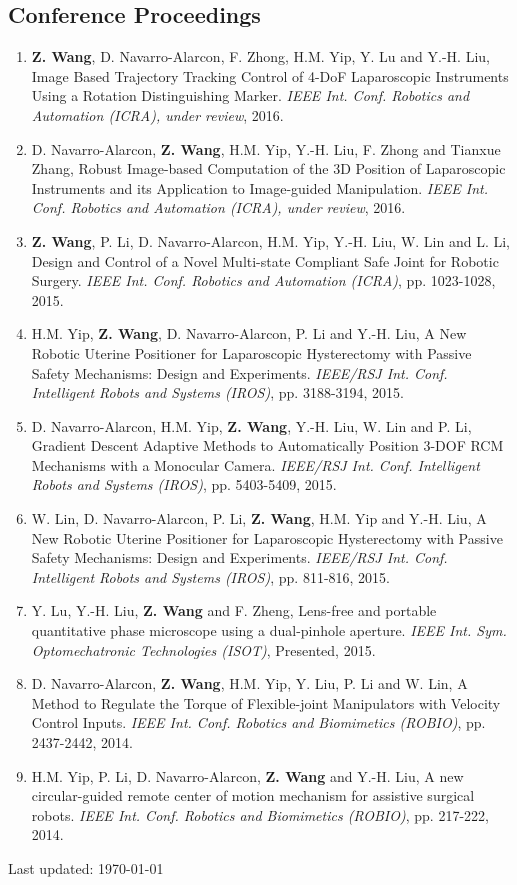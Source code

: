 \documentclass[10pt,letterpaper]{article}
\begin{document}
\subsection*{Conference Proceedings}
\begin{enumerate}
\item \textbf{Z. Wang}, D. Navarro-Alarcon, F. Zhong, H.M. Yip, Y. Lu and Y.-H. Liu,
  Image Based Trajectory Tracking Control of 4-DoF Laparoscopic Instruments Using a Rotation Distinguishing Marker.
  \textit{{IEEE} Int. Conf. Robotics and Automation (ICRA), under review}, 2016.
\item D. Navarro-Alarcon, \textbf{Z. Wang}, H.M. Yip, Y.-H. Liu, F. Zhong and Tianxue Zhang,
  Robust Image-based Computation of the 3D Position of Laparoscopic Instruments and its Application to Image-guided Manipulation.
  \textit{{IEEE} Int. Conf. Robotics and Automation (ICRA), under review}, 2016.
\item \textbf{Z. Wang}, P. Li, D. Navarro-Alarcon, H.M. Yip, Y.-H. Liu, W. Lin and L. Li,
  Design and Control of a Novel Multi-state Compliant Safe Joint for Robotic Surgery.
  \textit{{IEEE} Int. Conf. Robotics and Automation (ICRA)}, pp. 1023-1028, 2015.
\item H.M. Yip, \textbf{Z. Wang}, D. Navarro-Alarcon, P. Li and Y.-H. Liu,
  A New Robotic Uterine Positioner for Laparoscopic Hysterectomy with Passive Safety Mechanisms: Design and Experiments.
  \textit{{IEEE/RSJ} Int. Conf. Intelligent Robots and Systems (IROS)}, pp. 3188-3194, 2015.
\item D. Navarro-Alarcon, H.M. Yip, \textbf{Z. Wang}, Y.-H. Liu, W. Lin and P. Li,
  Gradient Descent Adaptive Methods to Automatically Position 3-DOF RCM Mechanisms with a Monocular Camera.
  \textit{{IEEE/RSJ} Int. Conf. Intelligent Robots and Systems (IROS)}, pp. 5403-5409, 2015.
\item W. Lin, D. Navarro-Alarcon, P. Li, \textbf{Z. Wang}, H.M. Yip and Y.-H. Liu,
  A New Robotic Uterine Positioner for Laparoscopic Hysterectomy with Passive Safety Mechanisms: Design and Experiments.
  \textit{{IEEE/RSJ} Int. Conf. Intelligent Robots and Systems (IROS)}, pp. 811-816, 2015.
\item Y. Lu, Y.-H. Liu, \textbf{Z. Wang} and F. Zheng,
  Lens-free and portable quantitative phase microscope using a dual-pinhole aperture.
  \textit{{IEEE} Int. Sym. Optomechatronic Technologies (ISOT)}, Presented, 2015.
\item D. Navarro-Alarcon, \textbf{Z. Wang}, H.M. Yip, Y. Liu, P. Li and W. Lin,
  A Method to Regulate the Torque of Flexible-joint Manipulators with Velocity Control Inputs.
  \textit{{IEEE} Int. Conf. Robotics and Biomimetics (ROBIO)}, pp. 2437-2442, 2014.
\item H.M. Yip, P. Li, D. Navarro-Alarcon, \textbf{Z. Wang} and Y.-H. Liu,
  A new circular-guided remote center of motion mechanism for assistive surgical robots.
  \textit{{IEEE} Int. Conf. Robotics and Biomimetics (ROBIO)}, pp. 217-222, 2014.
\end{enumerate}

\bigskip
{\small Last updated: \today}
\end{document}
